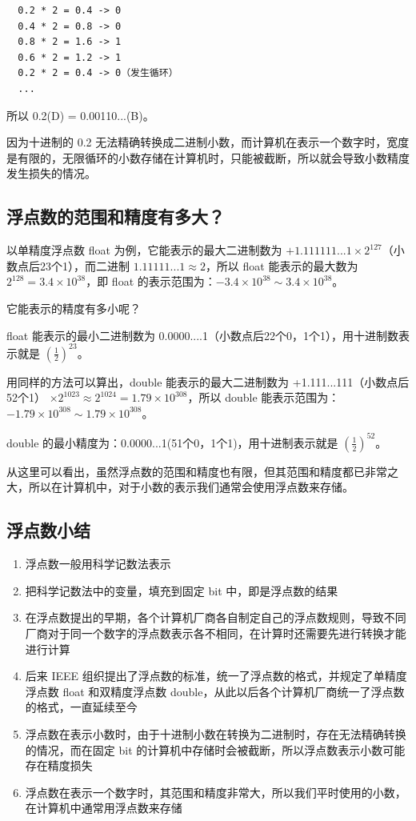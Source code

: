 \begin{lstlisting}
  0.2 * 2 = 0.4 -> 0
  0.4 * 2 = 0.8 -> 0
  0.8 * 2 = 1.6 -> 1
  0.6 * 2 = 1.2 -> 1
  0.2 * 2 = 0.4 -> 0（发生循环）
  ...
\end{lstlisting}

所以 0.2(D) = 0.00110...(B)。

因为十进制的 0.2 无法精确转换成二进制小数，而计算机在表示一个数字时，宽度是有限的，无限循环的小数存储在计算机时，只能被截断，所以就会导致小数精度发生损失的情况。

\subsection{浮点数的范围和精度有多大？}

以单精度浮点数 float 为例，它能表示的最大二进制数为 $+1.111111...1 \times 2 ^{127}$（小数点后23个1），而二进制 $1.11111...1 ≈ 2$，所以 float 能表示的最大数为 $2^{128} = 3.4 \times 10^{38}$，即 float 的表示范围为：$-3.4 \times 10^{38} \sim 3.4 \times 10^{38}$。

它能表示的精度有多小呢？

float 能表示的最小二进制数为 0.0000....1（小数点后22个0，1个1），用十进制数表示就是 $(\frac{1}{2})^{23}$。

用同样的方法可以算出，double 能表示的最大二进制数为 +1.111...111（小数点后52个1） $\times 2^{1023} ≈ 2^{1024} = 1.79 \times 10^{308}$，所以 double 能表示范围为：$-1.79 \times 10^{308} \sim 1.79 \times 10^{308}$。

double 的最小精度为：0.0000...1(51个0，1个1)，用十进制表示就是 $(\frac{1}{2})^{52}$。

从这里可以看出，虽然浮点数的范围和精度也有限，但其范围和精度都已非常之大，所以在计算机中，对于小数的表示我们通常会使用浮点数来存储。
\subsection{浮点数小结}
\begin{enumerate}
  \item 浮点数一般用科学记数法表示
  \item 把科学记数法中的变量，填充到固定 bit 中，即是浮点数的结果
  \item 在浮点数提出的早期，各个计算机厂商各自制定自己的浮点数规则，导致不同厂商对于同一个数字的浮点数表示各不相同，在计算时还需要先进行转换才能进行计算
  \item 后来 IEEE 组织提出了浮点数的标准，统一了浮点数的格式，并规定了单精度浮点数 float 和双精度浮点数 double，从此以后各个计算机厂商统一了浮点数的格式，一直延续至今
  \item 浮点数在表示小数时，由于十进制小数在转换为二进制时，存在无法精确转换的情况，而在固定 bit 的计算机中存储时会被截断，所以浮点数表示小数可能存在精度损失
  \item 浮点数在表示一个数字时，其范围和精度非常大，所以我们平时使用的小数，在计算机中通常用浮点数来存储
\end{enumerate}

